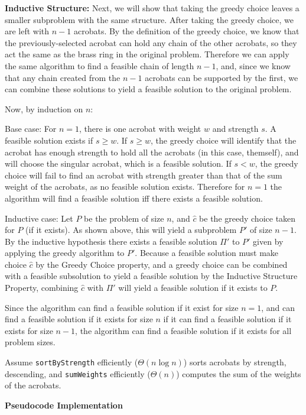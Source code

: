 \documentclass[11pt]{article}
\begin{document}
\textbf{Inductive Structure: }
Next, we will show that taking the greedy choice leaves a smaller subproblem with the same structure. After taking the greedy choice, we are left with $n-1$ acrobats. By the definition of the greedy choice, we know that the previously-selected acrobat can hold any chain of the other acrobats, so they act the same as the brass ring in the original problem. Therefore we can apply the same algorithm to find a feasible chain of length $n-1$, and, since we know that any chain created from the $n-1$ acrobats can be supported by the first, we can combine these solutions to yield a feasible solution to the original problem.

Now, by induction on $n$: 

Base case: For $n=1$, there is one acrobat with weight $w$ and strength $s$. A feasible solution exists if $s \geq w$. If $s \geq w$, the greedy choice will identify that the acrobat has enough strength to hold all the acrobats (in this case, themself), and will choose the singular acrobat, which is a feasible solution. If $s < w$, the greedy choice will fail to find an acrobat with strength greater than that of the sum weight of the acrobats, as no feasible solution exists. Therefore for $n=1$ the algorithm will find a feasible solution iff there exists a feasible solution.

Inductive case: Let $P$ be the problem of size $n$, and $\hat{c}$ be the greedy choice taken for $P$ (if it exists). As shown above, this will yield a subproblem $P'$ of size $n-1$. By the inductive hypothesis there exists a feasible solution $\Pi'$ to $P'$ given by applying the greedy algorithm to $P'$. Because a feasible solution must make choice $\hat{c}$ by the Greedy Choice property, and a greedy choice can be combined with a feasible subsolution to yield a feasible solution by the Inductive Structure Property, combining $\hat{c}$ with $\Pi'$ will yield a feasible solution if it exists to $P$. 

Since the algorithm can find a feasible solution if it exist for size $n=1$, and can find a feasible solution if it exists for size $n$ if it can find a feasible solution if it exists for size $n-1$, the algorithm can find a feasible solution if it exists for all problem sizes. 

Assume \texttt{sortByStrength} efficiently ($\Theta(n\log n)$) sorts acrobats by strength, descending, and \texttt{sumWeights} efficiently ($\Theta(n)$) computes the sum of the weights of the acrobats.

\textbf{Pseudocode Implementation}
\end{document}
